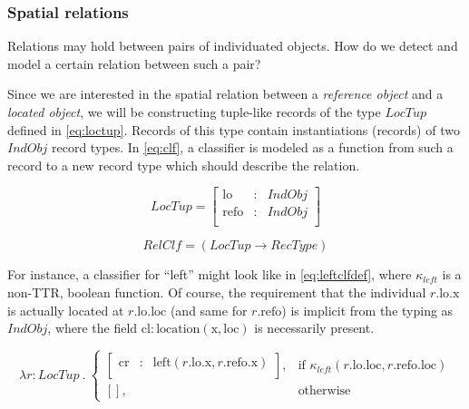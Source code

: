 \subsubsection{Spatial relations}

Relations may hold between pairs of individuated objects.
How do we detect and model a certain relation between such a pair?

Since we are interested in the spatial relation between a \textit{reference object} and a \textit{located object}, we will be constructing tuple-like records of the type $LocTup$ defined in \autoref{eq:loctup}.
Records of this type contain instantiations (records) of two $IndObj$ record types.
In \autoref{eq:clf}, a classifier is modeled as a function from such a record to a new record type which should describe the relation.

\begin{equation}\label{eq:loctup}
LocTup = \left[\begin{array}{rcl}
    \text{lo} &:& IndObj \\
    \text{refo} &:& IndObj \\
    \end{array}\right]
\end{equation}

\begin{equation}\label{eq:clf}
RelClf = ( LocTup \rightarrow RecType )
\end{equation}

For instance, a classifier for ``left'' might look like in \autoref{eq:leftclfdef}, where $\kappa_{left}$ is a non-TTR, boolean function.
Of course, the requirement that the individual $r.\text{lo}.\text{x}$ is actually located at $r.\text{lo}.\text{loc}$ (and same for $r.\text{refo}$) is implicit from the typing as $IndObj$, where the field $\text{cl} : \text{location}(\text{x}, \text{loc})$ is necessarily present.

\begin{equation}\label{eq:leftclfdef}
\lambda r : LocTup \ .\ 
\begin{cases}
\left[\begin{array}{rcl}
    \text{cr} &:& \text{left}(r.\text{lo}.\text{x}, r.\text{refo}.\text{x}) \\
\end{array}\right],
& \text{if } \kappa_{left}(r.\text{lo}.\text{loc}, r.\text{refo}.\text{loc}) \\
[], & \text{otherwise}
\end{cases}
\end{equation}



